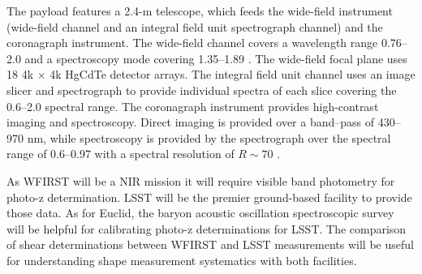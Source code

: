 The payload features a 2.4-m telescope, which feeds the wide-field instrument (wide-field channel and an integral field unit spectrograph channel) and the coronagraph instrument. The wide-field channel covers a wavelength range 0.76--2.0 \um and a spectroscopy mode covering 1.35--1.89 \um. The wide-field focal plane uses 18 4k $\times$ 4k HgCdTe detector arrays. The integral field unit channel uses an image slicer and spectrograph to provide individual spectra of each slice covering the 0.6--2.0 \um spectral range. The coronagraph instrument provides high-contrast imaging and spectroscopy. Direct imaging is provided over a band--pass of 430--970 nm, while spectroscopy is provided by the spectrograph over the spectral range of 0.6--0.97 \um with a spectral resolution of $R\sim70$ \cite{WFIRST_report}.

As WFIRST will be a NIR mission it will require visible band photometry for photo-z determination. LSST will be the premier ground-based facility to provide those data. As for Euclid, the baryon acoustic oscillation spectroscopic survey will be helpful for calibrating photo-z determinations for LSST. The comparison of shear determinations between WFIRST and LSST measurements will be useful for understanding shape measurement systematics with both facilities.